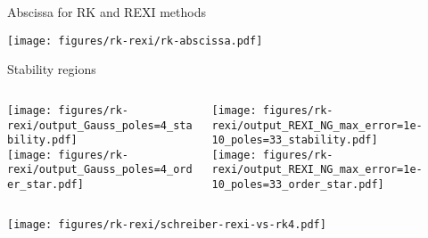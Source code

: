 \documentclass{beamer}
\begin{document}
\begin{frame}{Abscissa for RK and REXI methods}
  \begin{center}
    \texttt{[image: figures/rk-rexi/rk-abscissa.pdf]}
  \end{center}
\end{frame}

\begin{frame}{Stability regions}
  \begin{columns}
    \begin{column}{.5\textwidth}
      \texttt{[image: figures/rk-rexi/output\_Gauss\_poles=4\_stability.pdf]} \\
      \texttt{[image: figures/rk-rexi/output\_Gauss\_poles=4\_order\_star.pdf]}
    \end{column}
    \begin{column}{.5\textwidth}
      \texttt{[image: figures/rk-rexi/output\_REXI\_NG\_max\_error=1e-10\_poles=33\_stability.pdf]} \\
      \texttt{[image: figures/rk-rexi/output\_REXI\_NG\_max\_error=1e-10\_poles=33\_order\_star.pdf]}
    \end{column}
  \end{columns}
\end{frame}

\begin{frame}
  \texttt{[image: figures/rk-rexi/schreiber-rexi-vs-rk4.pdf]}
\end{frame}
\end{document}
